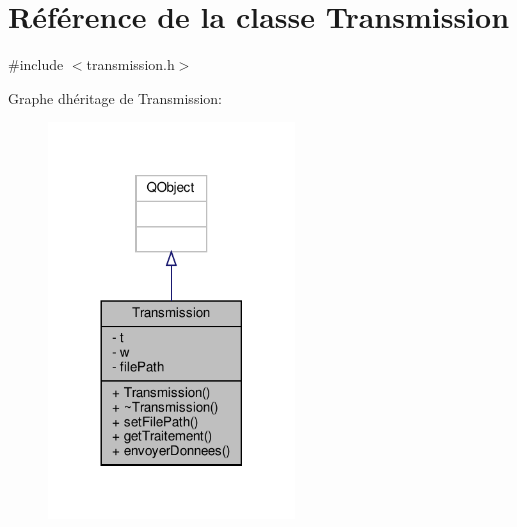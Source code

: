 \hypertarget{classTransmission}{}\section{Référence de la classe Transmission}
\label{classTransmission}


{\ttfamily \#include $<$transmission.\+h$>$}



Graphe d\textquotesingle{}héritage de Transmission\+:\nopagebreak
\begin{figure}[H]
\begin{center}
\leavevmode
\includegraphics[width=185pt]{classTransmission__inherit__graph}
\end{center}
\end{figure}


